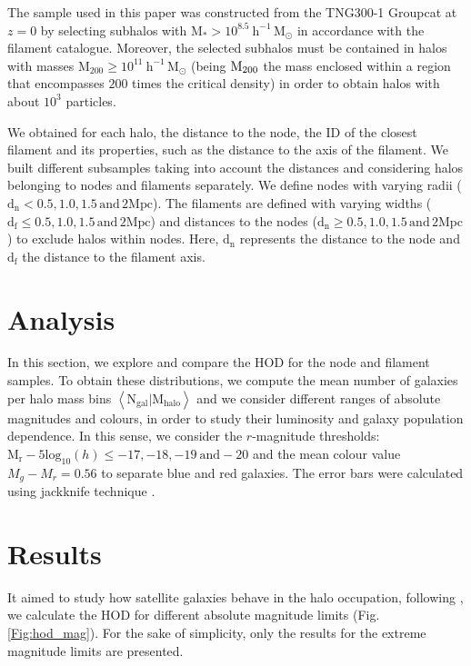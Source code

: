 \documentclass[baaa]{baaa}
\begin{document}
The sample used in this paper was constructed from the TNG300-1 Groupcat at $z=0$  by selecting subhalos with $\text{M}_* > 10^{8.5}~\mathrm{h^{-1}\,M}_{\odot}$ in accordance with the filament catalogue. 
Moreover, the selected subhalos must be contained in halos with masses $\text{M}_{200} \geq 10^{11}~\mathrm{h^{-1}\,M}_{\odot}$ (being ${\rm M}_{200}$ the mass enclosed within a region that encompasses $200$ times the critical density) in order to obtain halos with about $10^3$ particles.

We obtained for each halo, the distance to the node, the ID of the closest filament and its properties, such as the distance to the axis of the filament. We built different subsamples taking into account the distances and considering halos belonging to nodes and filaments separately. 
We define nodes with varying radii ($\mathrm{d_n}<0.5, 1.0, 1.5 \, \text{and} \, 2 \mathrm{Mpc}$). The filaments are defined with varying widths ($\mathrm{d_f} \leq 0.5, 1.0, 1.5 \, \text{and} \, 2 \mathrm{Mpc}$) and distances to the nodes ($\mathrm{d_n} \geq 0.5, 1.0, 1.5 \, \text{and} \, 2 \mathrm{Mpc}$) to exclude halos within nodes. Here, $\mathrm{d_n}$ represents the distance to the node and $\mathrm{d_f}$ the distance to the filament axis.




\section{Analysis}

In this section, we explore and compare the HOD for the node and filament samples.
To obtain these distributions, we compute the mean number of galaxies per halo mass bins $\left< \text{N}_{\text{gal}} | \text{M}_{\text{halo}} \right>$ and we consider different ranges of absolute magnitudes and colours, in order to study their luminosity and galaxy population dependence.
In this sense, we consider the $r$-magnitude thresholds: $\text{M}_\text{r} - 5\text{log}_{10}(h) \leq -17, -18, -19\ \text{and} -20$ and the mean colour value $M_g - M_r = 0.56$ to separate blue and red galaxies.
The error bars were calculated using jackknife technique \citep{Quenouille1949,Tukey1958}.


\section{Results}

It aimed to study how satellite galaxies behave in the halo occupation, following \cite{Alfaro2020,Perez2024}, we calculate the HOD for different absolute magnitude limits (Fig. \ref{Fig:hod_mag}). 
For the sake of simplicity, only the results for the extreme magnitude limits are presented.
\end{document}
